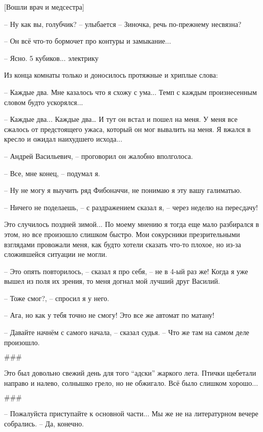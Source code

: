 [Вошли врач и медсестра]

-- Ну как вы, голубчик? -- улыбается -- Зиночка, речь по-прежнему несвязна?

-- Он всё что-то бормочет про контуры и замыкание...

-- Ясно. 5 кубиков... электрику

\asterisks
Из конца комнаты только и доносилось протяжные и хриплые слова:

-- Каждые два.
Мне казалось что я схожу с ума... Темп с каждым произнесенным словом будто ускорялся...

-- Каждые два... Каждые два…
И тут он встал и пошел на меня. У меня все сжалось от предстоящего ужаса, который он мог вывалить на меня. Я вжался в кресло и ожидал наихудшего исхода...

-- Андрей Васильевич, -- проговорил он жалобно вполголоса.

-- Все, мне конец, -- подумал я.

-- Ну не могу я выучить ряд Фибоначчи, не понимаю я эту вашу галиматью.

-- Ничего не поделаешь, -- с раздражением сказал я, -- через неделю на пересдачу!

\asterisks
Это случилось поздней зимой... По моему мнению я тогда еще мало разбирался в этом, но все произошло слишком быстро. Мои сокурсники презрительными взглядами провожали меня, как будто хотели сказать что-то плохое, но из-за сложившейся ситуации не могли.

-- Это опять повторилось, -- сказал я про себя, -- не в 4-ый раз же!
Когда я уже вышел из поля их зрения, то меня догнал мой лучший друг Василий.

-- Тоже смог?, -- спросил я у него.

-- Ага, но как у тебя точно не смогу! Это все же автомат по матану!

\asterisks
-- Давайте начнём с самого начала, -- сказал судья. -- Что же там на самом деле произошло.

\begin{center}\( \#\#\# \)\end{center}

Это был довольно свежий день для того ``адски'' жаркого лета. Птички щебетали направо и налево, солнышко грело, но не обжигало.
Всё было слишком хорошо...

\begin{center}\( \#\#\# \)\end{center}

-- Пожалуйста приступайте к основной части... Мы же не на литературном вечере собрались.
-- Да, конечно.

